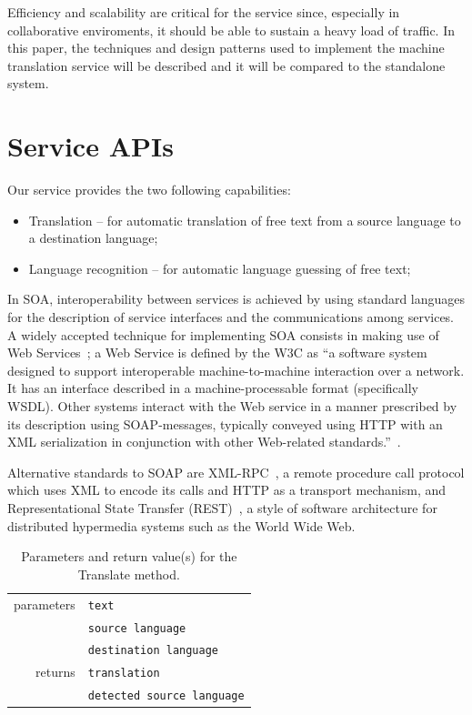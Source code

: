 \documentclass[11pt]{article}
\begin{document}
Efficiency and scalability are critical for the service since, especially in collaborative enviroments, it should be able to sustain a heavy load of traffic. In this paper, the techniques and design patterns used to implement the machine translation service will be described and it will be compared to the standalone system.


\section{Service APIs}

Our service provides the two following capabilities:

\begin{itemize}
  \item Translation -- for automatic translation of free text from a source language to a destination language;
  \item Language recognition -- for automatic language guessing of free text;
\end{itemize}

In SOA, interoperability between services is achieved by using standard languages for the description of service interfaces and the communications among services. A widely accepted technique for implementing SOA consists in making use of Web Services~\citep{soa}; a Web  Service is defined by the W3C as ``a software system designed to support interoperable machine-to-machine interaction over a network. It has an interface described in a machine-processable format (specifically WSDL). Other systems interact with the Web service in a manner prescribed by its description using SOAP-messages, typically conveyed using HTTP with an XML serialization in conjunction with other Web-related standards.''~\citep{wsgloss}. 

Alternative standards to SOAP are XML-RPC~\citep{xmlrpcspec}, a remote procedure call protocol which uses XML to encode its calls and HTTP as a transport mechanism, and Representational State Transfer (REST)~\citep{rest}, a style of software architecture for distributed hypermedia systems such as the World Wide Web.

\begin{table}[!ht]
\begin{center}
 \begin{tabular}{|r|l|}
  \hline
   parameters	& {\tt\small text} \\ \cline{2-2}
   				& {\tt\small source language} \\ \cline{2-2}
   				& {\tt\small destination language} \\
  \hline \hline
   returns 	& {\tt\small translation} \\ \cline{2-2}
   			& {\tt\small detected source language} \\
  \hline
 \end{tabular}
\end{center}
\caption{Parameters and return value(s) for the Translate method.}
\label{tab:translate}
\end{table}
\end{document}
